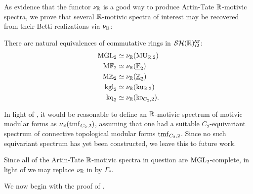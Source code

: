As evidence that the functor $\nu_{\mathbb{R}}$ is a good way to produce Artin-Tate $\mathbb{R}$-motivic spectra, we prove that several $\mathbb{R}$-motivic spectra of interest may be recovered from their Betti realizations via $\nu_{\mathbb{R}}$:

\begin{thm}\label{thm:recover}
  There are natural equivalences of commutative rings in $\SHRat$:
  \begin{align*}
    \mathrm{MGL}_2 &\simeq \nu_{\mathbb{R}} (\operatorname{\mathrm{MU}}_{\mathbb{R},2}) \\
    \mathrm{M}\mathbb{F}_2 &\simeq \nu_{\mathbb{R}} (\underline{\mathbb{F}}_2) \\
    \mathrm{M}\mathbb{Z}_{2} &\simeq \nu_{\mathbb{R}} (\underline{\mathbb{Z}}_{2}) \\
    \mathrm{kgl}_2 &\simeq \nu_{\mathbb{R}} (\mathrm{ku}_{\mathbb{R},2}) \\
    \mathrm{kq}_2 &\simeq \nu_{\mathbb{R}} (\mathrm{ko}_{C_2, 2}).
  \end{align*}
\end{thm}

\begin{rmk}
  In light of , it would be reasonable to define an $\mathbb{R}$-motivic spectrum of motivic modular forms as $\nu_{\mathbb{R}} (\mathrm{tmf}_{C_2,2})$, assuming that one had a suitable $C_2$-equivariant spectrum of connective topological modular forms $\mathrm{tmf}_{C_2,2}$.
  Since no such equivariant spectrum has yet been constructed, we leave this to future work. 
\end{rmk}

\begin{rmk} \label{rmk:gamma-nu-same}
  Since all of the Artin-Tate $\mathbb{R}$-motivic spectra in question are $\mathrm{MGL}_2$-complete, in light of  we may replace $\nu_{\mathbb{R}}$ in  by $\Gamma_*$.
\end{rmk}

We now begin with the proof of .

